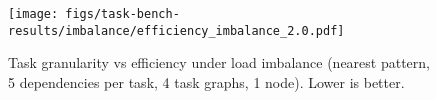 \begin{figure}[t]

\centering
\texttt{[image: figs/task-bench-results/imbalance/efficiency\_imbalance\_2.0.pdf]}

\caption{Task granularity vs efficiency under load imbalance (nearest pattern, 5 dependencies per task, 4 task graphs, 1 node). Lower is better.\label{fig:efficiency-imbalance}}
\end{figure}
